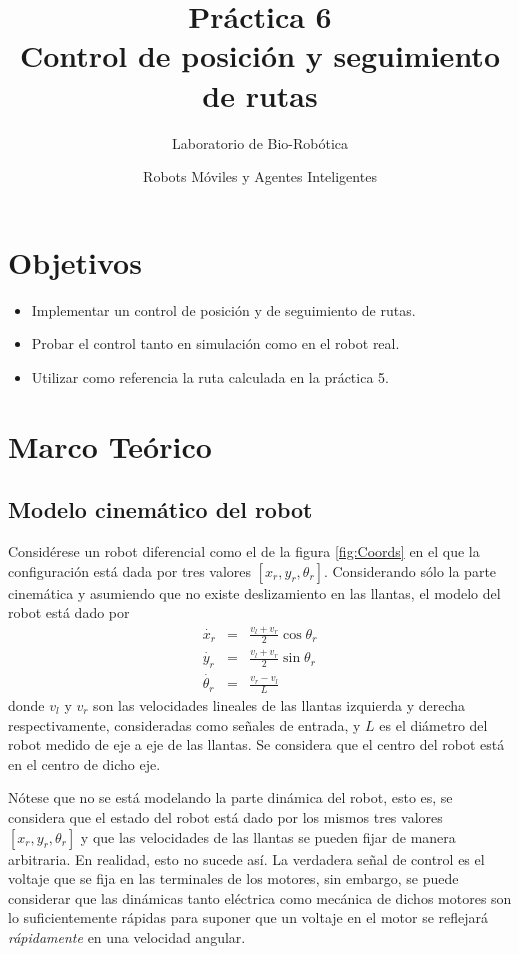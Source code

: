 \documentclass[letterpaper,12pt]{article}
\title{Práctica 6  \\ Control de posición y seguimiento de rutas}
\author{Laboratorio de Bio-Robótica}
\date{Robots Móviles y Agentes Inteligentes}
\begin{document}
\renewcommand{\tablename}{Tabla}
\maketitle
\section*{Objetivos}
\begin{itemize}
\item Implementar un control de posición y de seguimiento de rutas. 
\item Probar el control tanto en simulación como en el robot real.
\item Utilizar como referencia la ruta calculada en la práctica 5.
\end{itemize}

\section{Marco Teórico}
\subsection{Modelo cinemático del robot}
Considérese un robot diferencial como el de la figura \ref{fig:Coords} en el que la configuración está dada por tres valores $\left[x_r, y_r, \theta_r\right]$. Considerando sólo la parte cinemática y asumiendo que no existe deslizamiento en las llantas, el modelo del robot está dado por
\begin{eqnarray}                                                                                                                        
\dot{x_r} &=& \frac{v_l + v_r}{2}\cos\theta_r\label{eq:Kinematic1}\\                                                                        
\dot{y_r} &=& \frac{v_l + v_r}{2}\sin\theta_r\\                                                                                             
\dot{\theta_r} &=& \frac{v_r - v_l}{L}\label{eq:Kinematic3}                                                                               
\end{eqnarray}
donde $v_l$ y $v_r$ son las velocidades lineales de las llantas izquierda y derecha respectivamente, consideradas como señales de entrada, y $L$ es el diámetro del robot medido de eje a eje de las llantas. Se considera que el centro del robot está en el centro de dicho eje.

Nótese que no se está modelando la parte dinámica del robot, esto es, se considera que el estado del robot está dado por los mismos tres valores $\left[x_r, y_r, \theta_r\right]$ y que las velocidades de las llantas se pueden fijar de manera arbitraria. En realidad, esto no sucede así. La verdadera señal de control es el voltaje que se fija en las terminales de los motores, sin embargo, se puede considerar que las dinámicas tanto eléctrica como mecánica de dichos motores son lo suficientemente rápidas para suponer que un voltaje en el motor se reflejará \textit{rápidamente} en una velocidad angular.
\end{document}
